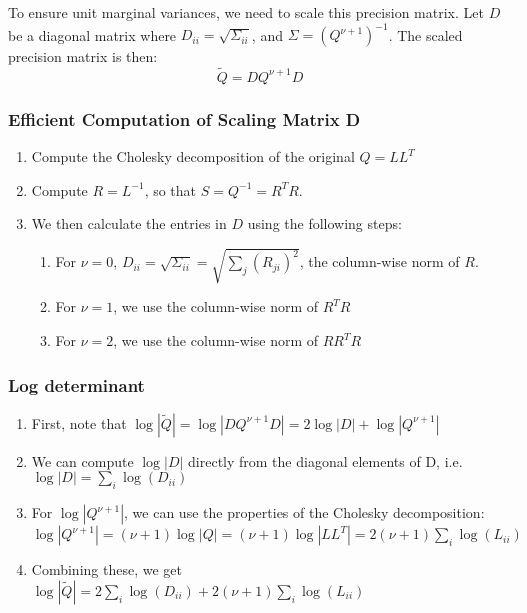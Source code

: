 \documentclass[
  12pt]{article}
\providecommand{\tightlist}{%
  \setlength{\itemsep}{0pt}\setlength{\parskip}{0pt}}\usepackage{longtable,booktabs,array}
\begin{document}
To ensure unit marginal variances, we need to scale this precision
matrix. Let \(D\) be a diagonal matrix where
\(D_{ii} = \sqrt{\Sigma_{ii}}\), and \(\Sigma = (Q^{\nu+1})^{-1}\). The
scaled precision matrix is then: \[
\tilde{Q} = DQ^{\nu+1}D
\]

\subsubsection{Efficient Computation of Scaling Matrix
D}\label{efficient-computation-of-scaling-matrix-d}

\begin{enumerate}
\def\labelenumi{\arabic{enumi}.}
\tightlist
\item
  Compute the Cholesky decomposition of the original \(Q = LL^T\)
\item
  Compute \(R = L^{-1}\), so that \(S = Q^{-1} = R^TR\).
\item
  We then calculate the entries in \(D\) using the following steps:

  \begin{enumerate}
  \def\labelenumii{\roman{enumii}.}
  \tightlist
  \item
    For \(\nu = 0\),
    \(D_{ii} = \sqrt{\Sigma_{ii}} = \sqrt{\sum_j (R_{ji})^2}\), the
    column-wise norm of \(R\).
  \item
    For \(\nu = 1\), we use the column-wise norm of \(R^TR\)
  \item
    For \(\nu = 2\), we use the column-wise norm of \(RR^TR\)
  \end{enumerate}
\end{enumerate}

\subsubsection{Log determinant}\label{log-determinant}

\begin{enumerate}
\def\labelenumi{\arabic{enumi}.}
\tightlist
\item
  First, note that
  \(\log|\tilde{Q}| = \log|DQ^{\nu+1}D| = 2\log|D| + \log|Q^{\nu+1}|\)
\item
  We can compute \(\log|D|\) directly from the diagonal elements of D,
  i.e.~\(\log|D| = \sum_i \log(D_{ii})\)
\item
  For \(\log|Q^{\nu+1}|\), we can use the properties of the Cholesky
  decomposition:
  \(\log|Q^{\nu+1}| = (\nu+1)\log|Q| = (\nu+1)\log|LL^T| = 2(\nu+1)\sum_i \log(L_{ii})\)
\item
  Combining these, we get
  \(\log|\tilde{Q}| = 2\sum_i \log(D_{ii}) + 2(\nu+1)\sum_i \log(L_{ii})\)
\end{enumerate}
\end{document}
